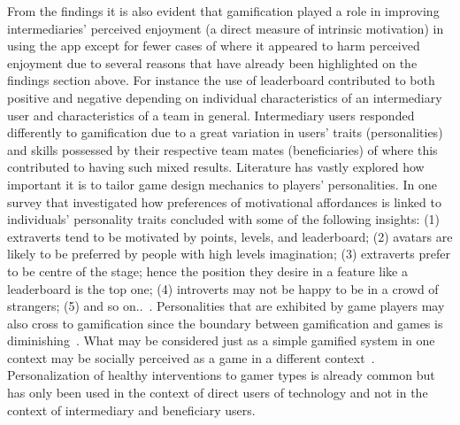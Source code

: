 From the findings it is also evident that gamification played a role in improving intermediaries' perceived enjoyment (a direct measure of intrinsic motivation) in using the app except for fewer cases of where it appeared to harm  perceived enjoyment due to several reasons that have already been highlighted on the findings section above. For instance the use of leaderboard contributed to both positive and negative depending on individual characteristics of an intermediary user and characteristics of a team in general. Intermediary users responded differently to gamification due to a great variation in users' traits (personalities) and skills possessed by their respective team mates (beneficiaries) of where this contributed to having such mixed results. Literature has vastly explored how important it is to tailor game design mechanics to players' personalities. In one survey that investigated how preferences of motivational affordances is linked to individuals' personality traits concluded with some of the following insights: (1) extraverts tend to be motivated by points, levels, and leaderboard; (2) avatars are likely to be preferred by people with high levels imagination; (3) extraverts prefer to be centre of the stage; hence the position they desire in a feature like a leaderboard is the top one; (4) introverts may not be happy to be in a crowd of strangers; (5) and so on..~\citep{jia2016personality}. Personalities that are exhibited by game players may also cross to gamification since the boundary between gamification and games is diminishing~\citep{ferro2013towards}. What may be considered just as a simple gamified system in one context may be socially perceived as a game in a different context~\citep{deterding2011game}. Personalization of healthy interventions to gamer types  is already common\cite{arteaga2010:persuasive,orji2013:tailoring} but has only been used in the context of direct users of technology and not in the context of intermediary and beneficiary users.

